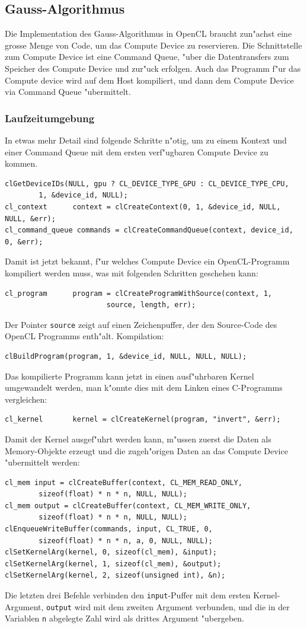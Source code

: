 \subsection{Gauss-Algorithmus}
Die Implementation des Gauss-Algorithmus in OpenCL braucht zun"achst eine
grosse Menge von Code, um das Compute Device zu reservieren.
Die Schnittstelle zum Compute Device ist eine Command Queue,
"uber die Datentransfers zum Speicher des Compute Device und zur"uck
erfolgen.
Auch das Programm f"ur das Compute device wird auf dem
Host kompiliert, und dann dem Compute Device via Command Queue
"ubermittelt.

\subsubsection{Laufzeitumgebung}
In etwas mehr Detail sind folgende Schritte n"otig, um zu einem
Kontext und einer Command Queue mit dem ersten verf"ugbaren
Compute Device zu kommen.
\begin{verbatim}
clGetDeviceIDs(NULL, gpu ? CL_DEVICE_TYPE_GPU : CL_DEVICE_TYPE_CPU,
        1, &device_id, NULL);
cl_context      context = clCreateContext(0, 1, &device_id, NULL, NULL, &err);
cl_command_queue commands = clCreateCommandQueue(context, device_id, 0, &err);
\end{verbatim}
Damit ist jetzt bekannt, f"ur welches Compute Device ein OpenCL-Programm
kompiliert werden muss, was mit folgenden Schritten geschehen kann:
\begin{verbatim}
cl_program      program = clCreateProgramWithSource(context, 1,
                        source, length, err);
\end{verbatim}
Der Pointer \verb+source+ zeigt auf einen Zeichenpuffer, der den Source-Code
des OpenCL Programms enth"alt. Kompilation:
\begin{verbatim}
clBuildProgram(program, 1, &device_id, NULL, NULL, NULL);
\end{verbatim}
Das kompilierte Programm kann jetzt in einen ausf"uhrbaren
Kernel umgewandelt werden, man k"onnte dies mit dem Linken eines
C-Programms vergleichen:
\begin{verbatim}
cl_kernel       kernel = clCreateKernel(program, "invert", &err);
\end{verbatim}

Damit der Kernel ausgef"uhrt werden kann, m"ussen zuerst die Daten
als Memory-Objekte erzeugt und die zugeh"origen Daten an das Compute Device
"ubermittelt werden:
\begin{verbatim}
cl_mem input = clCreateBuffer(context, CL_MEM_READ_ONLY,
        sizeof(float) * n * n, NULL, NULL);
cl_mem output = clCreateBuffer(context, CL_MEM_WRITE_ONLY,
        sizeof(float) * n * n, NULL, NULL);
clEnqueueWriteBuffer(commands, input, CL_TRUE, 0,
        sizeof(float) * n * n, a, 0, NULL, NULL);
clSetKernelArg(kernel, 0, sizeof(cl_mem), &input);
clSetKernelArg(kernel, 1, sizeof(cl_mem), &output);
clSetKernelArg(kernel, 2, sizeof(unsigned int), &n);
\end{verbatim}
Die letzten drei Befehle verbinden den \verb+input+-Puffer mit dem ersten
Kernel-Argument, \verb+output+ wird mit dem zweiten
Argument verbunden, und die in der Variablen \verb+n+ abgelegte
Zahl wird als drittes Argument "ubergeben.

